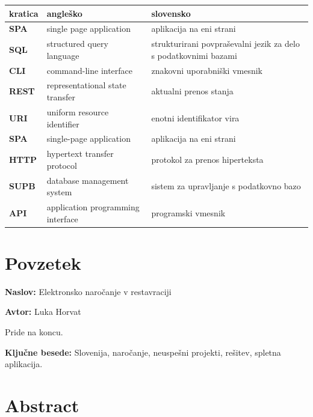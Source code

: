 \documentclass[a4paper, 12pt]{book}
\newcommand{\ttitle}{Elektronsko naročanje v restavraciji}
\newcommand{\tauthor}{Luka Horvat}
\newcommand{\tkeywords}{Slovenija, naročanje, neuspešni projekti, rešitev, spletna aplikacija}
\newcommand{\clearemptydoublepage}{\newpage{\pagestyle{empty}\cleardoublepage}}
\begin{document}
\noindent\begin{tabular}{p{}|p{}|p{}}    %
  {\bf kratica} & {\bf angleško}                             & {\bf slovensko} \\ \hline
  {\bf SPA}      & single page application               &  aplikacija na eni strani \\
  {\bf SQL} & structured query language & strukturirani povpraševalni jezik za delo s podatkovnimi bazami  \\
  {\bf CLI}   & command-line interface              & znakovni uporabniški vmesnik \\
  {\bf REST}   & representational state transfer              & aktualni prenos stanja \\
  {\bf URI}   &  uniform resource identifier              & enotni identifikator vira \\
  {\bf SPA}   &  single-page application              & aplikacija na eni strani \\
  {\bf HTTP}   &  hypertext transfer protocol               & protokol za prenos hiperteksta \\
  {\bf SUPB}   &  database management system              & sistem za upravljanje s podatkovno bazo \\
  {\bf API}   &  application programming interface              & programski vmesnik\\
\end{tabular}


\clearemptydoublepage

\chapter*{Povzetek}

\noindent\textbf{Naslov:} \ttitle
\bigskip

\noindent\textbf{Avtor:} \tauthor
\bigskip

\noindent 
Pride na koncu.

\noindent\textbf{Ključne besede:} \tkeywords.
\clearemptydoublepage

\chapter*{Abstract}
\end{document}
